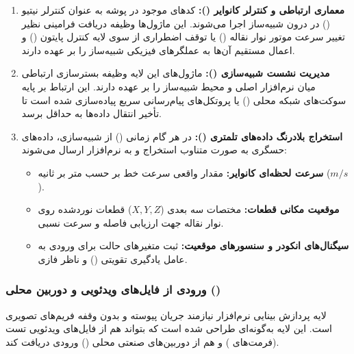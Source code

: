 \documentclass[a4paper, 10pt, twocolumn]{article}
\begin{document}
	\begin{enumerate}
		\item \textbf{معماری ارتباطی و کنترلر کانوایر ():} 
		کدهای موجود در پوشه  به عنوان کنترلر نیتیو () در درون شبیه‌ساز اجرا می‌شوند. این ماژول‌ها وظیفه دریافت فرامینی نظیر تغییر سرعت موتور نوار نقاله () یا توقف اضطراری از سوی لایه کنترل پایتون () و اعمال مستقیم آن‌ها به عملگرهای فیزیکی شبیه‌ساز را بر عهده دارند.
		
		\item \textbf{مدیریت نشست شبیه‌سازی ():} 
		ماژول‌های این لایه وظیفه بسترسازی ارتباطی میان نرم‌افزار اصلی و محیط شبیه‌ساز را بر عهده دارند. این ارتباط بر پایه سوکت‌های شبکه محلی () یا پروتکل‌های پیام‌رسانی سریع پیاده‌سازی شده است تا تأخیر انتقال داده‌ها به حداقل برسد.
		
		\item \textbf{استخراج بلادرنگ داده‌های تلمتری ():} 
		در هر گام زمانی () از شبیه‌سازی، داده‌های حسگری به صورت متناوب استخراج و به نرم‌افزار ارسال می‌شوند:
		\begin{itemize}
			\item \textbf{سرعت لحظه‌ای کانوایر:} مقدار واقعی سرعت خط بر حسب متر بر ثانیه ($m/s$).
			\item \textbf{موقعیت مکانی قطعات:} مختصات سه بعدی ($X, Y, Z$) قطعات نوردشده روی نوار نقاله جهت ارزیابی فاصله و سرعت نسبی.
			\item \textbf{سیگنال‌های انکودر و سنسورهای موقعیت:} ثبت متغیرهای حالت برای ورودی به عامل یادگیری تقویتی () و ناظر فازی.
		\end{itemize}
	\end{enumerate}
	
	\subsubsection{ورودی از فایل‌های ویدئویی و دوربین محلی ()}
	لایه پردازش بینایی نرم‌افزار نیازمند جریان پیوسته و بدون وقفه فریم‌های تصویری است. این لایه به‌گونه‌ای طراحی شده است که بتواند هم از فایل‌های ویدئویی تست (فرمت‌های ) و هم از دوربین‌های صنعتی محلی () ورودی دریافت کند.
	
\end{document}
